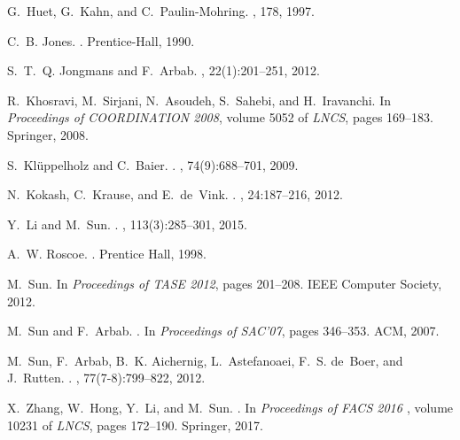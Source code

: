 \documentclass[preprint,3p]{elsarticle}
\begin{document}
\begin{thebibliography}{ 10}
G.~Huet, G.~Kahn, and C.~Paulin-Mohring.
, 178, 1997.

C.~B. Jones.
.
\newblock Prentice-Hall, 1990.

S.~T.~Q. Jongmans and F.~Arbab.
, 22(1):201--251, 2012.

R.~Khosravi, M.~Sirjani, N.~Asoudeh, S.~Sahebi, and H.~Iravanchi.
\newblock In {\em Proceedings of COORDINATION 2008}, volume 5052 of {\em LNCS},
  pages 169--183. Springer, 2008.

S.~Kl{\"u}ppelholz and C.~Baier.
.
, 74(9):688--701, 2009.

N.~Kokash, C.~Krause, and E.~de~Vink.
.
, 24:187--216, 2012.

Y.~Li and M.~Sun.
.
, 113(3):285--301, 2015.

A.~W. Roscoe.
.
\newblock Prentice Hall, 1998.

M.~Sun.
\newblock In {\em Proceedings of TASE 2012}, pages 201--208. IEEE Computer
  Society, 2012.

M.~Sun and F.~Arbab.
.
\newblock In {\em {Proceedings of SAC'07}}, pages 346--353. ACM, 2007.

M.~Sun, F.~Arbab, B.~K. Aichernig, L.~Astefanoaei, F.~S. de~Boer, and
  J.~Rutten.
.
, 77(7-8):799--822, 2012.

X.~Zhang, W.~Hong, Y.~Li, and M.~Sun.
.
\newblock In {\em {Proceedings of FACS 2016 }}, volume 10231 of {\em {LNCS}},
  pages {172--190}. {Springer}, 2017.


\end{thebibliography}
\end{document}
